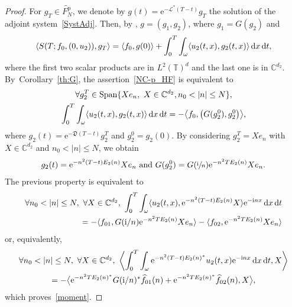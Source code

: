 \documentclass[10pt]{amsart}
\let\mathcal\mathscr
\theoremstyle{plain}
\theoremstyle{definition}
\theoremstyle{remark}
\DeclareMathOperator{\Span}{Span}
\newcommand{\diff}[1][-3]{\ensuremath{\mathop{}\mkern#1mu\mathrm{d}}}
\newcommand{\set}{\mathbb}
\renewcommand{\C}{\set{C}}
\newcommand{\T}{\set{T}}
\newcommand{\p}{{\mathrm p}}
\newcommand{\eu}{\mathrm e}
\newcommand{\iu}{\mathrm i}
\let\originalleft\left
\let\originalright\right
\renewcommand{\left}{\mathopen{}\mathclose\bgroup\originalleft}
\renewcommand{\right}{\aftergroup\egroup\originalright}
\begin{document}
\begin{proof}
For $g_T \in \widetilde{F^\p_N}$, we denote by $g(t)=\eu^{-\mathcal{L}^*(T-t)}g_T$ the solution of the adjoint system~\eqref{SystAdj}. Then, by , $g=(g_1,g_2)$, where $g_1=G(g_2)$ and
\[
\left\langle S(T;f_0,(0,u_2)), g_T \right\rangle = \left\langle f_0, g(0) \right\rangle + \int_0^T \int_{\omega} \left\langle u_2(t,x), g_2(t,x) \right\rangle \diff x \diff t,
\]
where the first two scalar products are in $L^2(\T)^{d}$ and the last one is in $\C^{d_2}$.
By~Corollary~\ref{th:G}, the assertion~\eqref{NC-p_HF} is equivalent to
\begin{multline}
\forall g_{2}^T \in \Span\{X e_n,\ X\in\C^{d_2}, n_0<|n|\leq N\},\\
\int_0^T \int_{\omega} \langle u_2(t,x), g_2(t,x) \rangle \diff x \diff t = -
\left\langle f_0, \left(G(g_2^0),g_2^0\right) \right\rangle,\end{multline}
where $g_2(t)=\eu^{-\mathfrak{D}(T-t)} g_2^T$ and $g_2^0=g_2(0)$.
By considering $g_2^T = X e_n$ with $X \in \C^{d_2}$ and $n_0 < |n|\leq N$, we obtain
\[
g_2(t)=\eu^{-n^2(T-t)E_2(n)} X e_n \text{ and }
G(g_2^0)=G\left(\sfrac{\iu}{n}\right)\eu^{-n^2 T E_2(n)} X e_n.
\]
The previous property is equivalent to
\begin{align*}
\forall n_0 < |n|\leq N,\ \forall X \in \C^{d_2}, \
\int_0^T \int_{\omega} \langle u_2(t,x), \eu^{-n^2(T-t)E_2(n)} X \rangle \eu^{-\iu nx} \diff x \diff t \\
= -
\langle f_{01}, G(\iu /n)\eu^{-n^2 T E_2(n)} X e_n \rangle - \langle f_{02}, \eu^{-n^2 T E_2(n)} X e_n \rangle
\end{align*}
or, equivalently,
\begin{multline*}
\forall n_0 < |n|\leq N,\ \forall X \in \C^{d_2}, \
\biggl\langle \int_0^T \int_{\omega} \eu^{-n^2(T-t)E_2(n)^*} u_2(t,x) \eu^{-\iu nx} \diff x \diff t, X \biggr\rangle\\
= -
\bigl\langle \eu^{-n^2 T E_2(n)^*} G(\iu /n)^* \widehat{f}_{01}(n) + \eu^{-n^2 T E_2(n)^*} \widehat{f}_{02}(n), X \bigr\rangle,
\end{multline*}
which proves~\eqref{moment}.


\end{proof}
\end{document}
